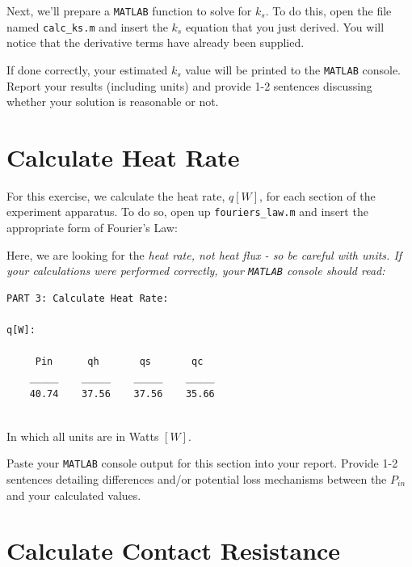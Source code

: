 \documentclass[11pt, letterpaper]{article}
\begin{document}
Next, we'll prepare a \texttt{MATLAB} function to solve for $k_s$. To do this, open the file named \texttt{calc\_ks.m} and insert the $k_s$ equation that you just derived. You will notice that the derivative terms have already been supplied.

\begin{formal}
    \begin{deliv}  
    If done correctly, your estimated $k_s$ value will be printed to the \texttt{MATLAB} console. Report your results (including units) and provide 1-2 sentences discussing whether your solution is reasonable or not.
    \end{deliv}
\end{formal}


\section{Calculate Heat Rate}

For this exercise, we calculate the heat rate, $q [W]$, for each section of the experiment apparatus. To do so, open up \texttt{fouriers\_law.m} and insert the appropriate form of Fourier's Law:


Here, we are looking for the \it{heat rate}, not \it{heat flux} - so be careful with units. If your calculations were performed correctly, your \texttt{MATLAB} console should read:

\begin{lstlisting}[numbers=none]
PART 3: Calculate Heat Rate: 

q[W]: 

     Pin      qh       qs       qc  
    _____    _____    _____    _____
    40.74    37.56    37.56    35.66
 
\end{lstlisting}
In which all units are in Watts $[W]$.

\begin{formal}
    \begin{deliv}  
    Paste your \texttt{MATLAB} console output for this section into your report. Provide 1-2 sentences detailing differences and/or potential loss mechanisms between the $P_{in}$ and your calculated values.
    \end{deliv}
\end{formal}


\section{Calculate Contact Resistance}
\end{document}
